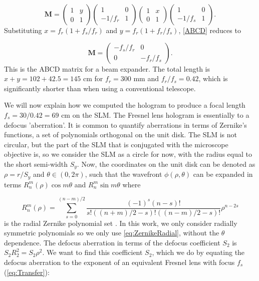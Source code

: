 \begin{equation}\label{ABCD}
	\mathbf{M}=
	\begin{pmatrix}
		1 & y \\
		0 & 1
	\end{pmatrix}
	\begin{pmatrix}
		1 & 0 \\
		-1/f_r & 1
	\end{pmatrix}
	\begin{pmatrix}
		1 & x \\
		0 & 1
	\end{pmatrix}
	\begin{pmatrix}
		1 & 0 \\
		-1/f_s & 1
	\end{pmatrix}.
\end{equation}
Substituting $x= f_r(1+f_s/f_r)$ and $y=f_r(1+f_r/f_s)$, \cref{ABCD} reduces to

\begin{equation}
	\mathbf{M}=
	\begin{pmatrix}
		-f_s/f_r & 0\\
		0 & -f_r/f_s
	\end{pmatrix}.
\end{equation}
This is the ABCD matrix for a beam expander. The total length is $x+y = 102 + 42.5 = 145$ cm for $f_r = 300$ mm and $f_r/f_s=0.42$, which is significantly shorter than when using a conventional telescope.

We will now explain how we computed the hologram to produce a focal length $f_s = 30 / 0.42 = 69$ cm on the SLM.
The Fresnel lens hologram is essentially to a defocus 'aberration'.
It is common to quantify aberrations in terms of Zernike's functions, a set of polynomials orthogonal on the unit disk. 
The SLM is not circular, but the part of the SLM that is conjugated with the microscope objective is, so we consider the SLM as a circle for now, with the radius equal to the short semi-width $S_y$.
Now, the coordinates on the unit disk can be denoted as $\rho = r/S_y$ and $\theta \in (0, 2\pi)$, such that the wavefront $\phi(\rho,\theta)$ can be expanded in terms $R_n^m(\rho)\cos{m\theta}$ and $R_n^m\sin{m\theta}$ where 

\begin{equation}\label{eq:ZernikeRadial}
    R_{n}^{m}(\rho)=
    \sum_{s=0}^{(n-m) / 2}
    \frac{(-1)^{s}(n-s) !}{s !\left((n+m)/2-s\right) !\left((n-m)/2-s\right) !} \rho^{n-2 s}
\end{equation}
is the radial Zernike polynomial set \cite{Mahajan94}.
In this work, we only consider radially symmetric polynomials so we only use \cref{eq:ZernikeRadial}, without the $\theta$ dependence.
The defocus aberration in terms of the defocus coefficient $S_2$ is $S_2 R_2^2 = S_2\rho^2$.
We want to find this coefficient $S_2$, which we do by equating the defocus aberration to the exponent of an equivalent Fresnel lens with focus $f_s$ (\cref{eq:Transfer}):

